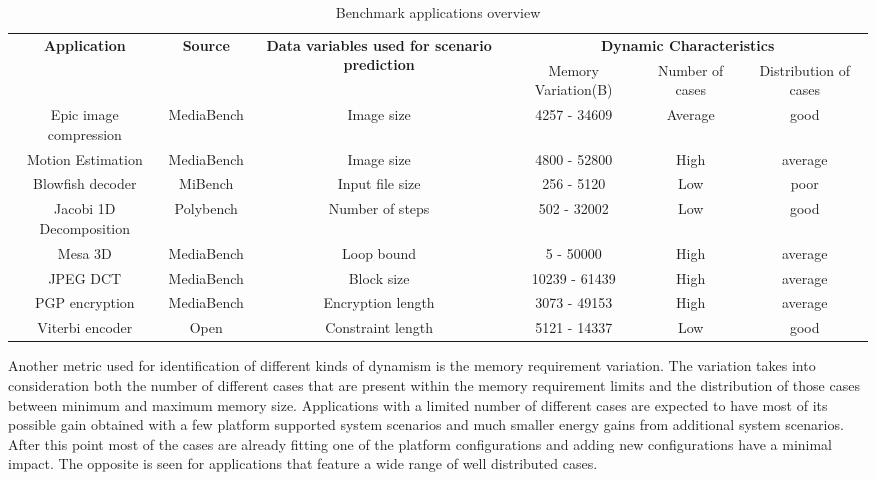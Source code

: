 \begin{landscape}
\clearpage
\thispagestyle{empty}
\begin{table}
\centering
\caption{Benchmark applications overview}
\label{tab:applications}
{\small
\hfill{}
\begin{tabular}{|c|c|c|c|c|c|}
\hline
\multirow{2}{*}{\textbf{Application}} & \multirow{2}{*}{\textbf{Source}} & \multirow{2}{*}{\parbox{4.2cm}{\textbf{Data variables used for scenario prediction}}} & \multicolumn{3}{c|}{\textbf{Dynamic Characteristics}} \\ \cline{4-6}
 & & & Memory Variation(B) & Number of cases & Distribution of cases\\ 
\hline 
Epic image compression & MediaBench & Image size & 4257 - 34609 & Average & good \\ 
\hline 
Motion Estimation & MediaBench 	& Image size & 4800 - 52800 & High & average \\ 
\hline 
Blowfish decoder & MiBench & Input file size & 256 - 5120 & Low  & poor \\ 
\hline 
Jacobi 1D Decomposition & Polybench & Number of steps & 502 - 32002 & Low  & good \\ 
\hline 
Mesa 3D & MediaBench & Loop bound & 5 - 50000 & High  & average\\ 
\hline 
JPEG DCT & MediaBench & Block size & 10239 - 61439 & High & average \\ 
\hline 
PGP encryption & MediaBench & Encryption length & 3073 - 49153 & High  & average \\ 
\hline 
Viterbi encoder & Open & Constraint length & 5121 - 14337 & Low & good \\ 
\hline 
\end{tabular}}
\end{table}
\end{landscape}

Another metric used for identification of different kinds of dynamism is the memory requirement variation. The variation takes into consideration both the number of different cases that are present within the memory requirement limits and the distribution of those cases between minimum and maximum memory size. Applications with a limited number of different cases are expected to have most of its possible gain obtained with a few platform supported system scenarios and much smaller energy gains from additional system scenarios. After this point most of the cases are already fitting one of the platform configurations and adding new configurations have a minimal impact. The opposite is seen for applications that feature a wide range of well distributed cases.

